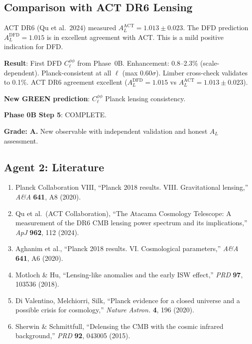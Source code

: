 \documentclass[11pt,a4paper]{article}
\begin{document}
\subsection{Comparison with ACT DR6 Lensing}

ACT DR6 (Qu et al.\ 2024) measured $A_L^{\mathrm{ACT}} = 1.013 \pm 0.023$. The DFD prediction $A_L^{\mathrm{DFD}} = 1.015$ is in excellent agreement with ACT. This is a mild positive indication for DFD.

\begin{tcolorbox}[colback=green!5!white, colframe=green!60!black, title={Agent 2: CMB Lensing $C_\ell^{\phi\phi}$ --- COMPUTED AND VALIDATED}]
\textbf{Result}: First DFD $C_\ell^{\phi\phi}$ from Phase~0B. Enhancement: 0.8--2.3\% (scale-dependent). Planck-consistent at all $\ell$ (max $0.60\sigma$). Limber cross-check validates to 0.1\%. ACT DR6 agreement excellent ($A_L^{\mathrm{DFD}} = 1.015$ vs $A_L^{\mathrm{ACT}} = 1.013 \pm 0.023$).

\textbf{New GREEN prediction}: $C_\ell^{\phi\phi}$ Planck lensing consistency.

\textbf{Phase 0B Step 5}: COMPLETE.

\textbf{Grade: A.} New observable with independent validation and honest $A_L$ assessment.
\end{tcolorbox}

\subsection{Agent 2: Literature}

\begin{enumerate}
\item Planck Collaboration VIII, ``Planck 2018 results. VIII. Gravitational lensing,'' \textit{A\&A} \textbf{641}, A8 (2020).
\item Qu et al.\ (ACT Collaboration), ``The Atacama Cosmology Telescope: A measurement of the DR6 CMB lensing power spectrum and its implications,'' \textit{ApJ} \textbf{962}, 112 (2024).
\item Aghanim et al., ``Planck 2018 results. VI. Cosmological parameters,'' \textit{A\&A} \textbf{641}, A6 (2020).
\item Motloch \& Hu, ``Lensing-like anomalies and the early ISW effect,'' \textit{PRD} \textbf{97}, 103536 (2018).
\item Di Valentino, Melchiorri, Silk, ``Planck evidence for a closed universe and a possible crisis for cosmology,'' \textit{Nature Astron.} \textbf{4}, 196 (2020).
\item Sherwin \& Schmittfull, ``Delensing the CMB with the cosmic infrared background,'' \textit{PRD} \textbf{92}, 043005 (2015).
\end{enumerate}
\end{document}
